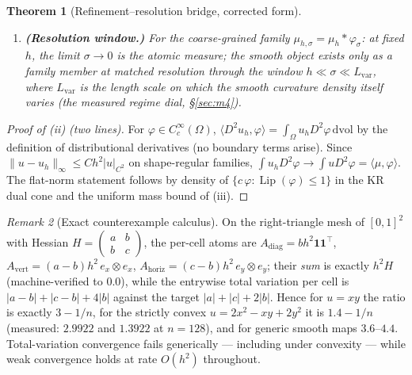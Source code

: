 \documentclass[11pt,a4paper]{article}
\theoremstyle{plain}
\newtheorem{theorem}{Theorem}[section]
\theoremstyle{definition}
\theoremstyle{remark}
\newtheorem{remark}[theorem]{Remark}
\newcommand{\Lip}{\operatorname{Lip}}
\newcommand{\dvol}{\,\mathrm{dvol}}
\begin{document}
\begin{theorem}[Refinement--resolution bridge, corrected form]
\begin{enumerate}[label=(\roman*),leftmargin=2em]
      naive three-facet patch is not the dual cell; the general statement
      requires the discrete-duality (dual-diamond) pairing.
\item \textbf{(Resolution window.)} For the coarse-grained family
      $\mu_{h,\sigma} = \mu_h * \varphi_\sigma$: at fixed $h$, the limit
      $\sigma \to 0$ is the \emph{atomic} measure; the smooth object
      exists only as a family member at matched resolution through the
      window $h \ll \sigma \ll L_{\mathrm{var}}$, where $L_{\mathrm{var}}$
      is the length scale on which the smooth curvature density itself
      varies (the measured regime dial,
      \S\ref{sec:m4}).
\end{enumerate}
\end{theorem}

\begin{proof}[Proof of (ii) (two lines)]
For $\varphi \in C_c^\infty(\Omega)$,
$\langle D^2 u_h, \varphi\rangle = \int_\Omega u_h D^2\varphi \dvol$ by the
definition of distributional derivatives (no boundary terms arise).
Since $\|u - u_h\|_\infty \le C h^2 |u|_{C^2}$ on shape-regular families,
$\int u_h D^2\varphi \to \int u D^2\varphi = \langle \mu, \varphi\rangle$.
The flat-norm statement follows by density of
$\{c\,\varphi : \Lip(\varphi)\le 1\}$ in the KR dual cone and the uniform
mass bound of (iii).
\end{proof}

\begin{remark}[Exact counterexample calculus]\label{rem:tvcounter}
On the right-triangle mesh of $[0,1]^2$ with Hessian
$H = \left(\begin{smallmatrix} a & b\\ b & c\end{smallmatrix}\right)$, the
per-cell atoms are $A_{\mathrm{diag}} = b h^2 \mathbf{1}\mathbf{1}^\top$,
$A_{\mathrm{vert}} = (a-b) h^2\, e_x \otimes e_x$,
$A_{\mathrm{horiz}} = (c-b) h^2\, e_y \otimes e_y$; their \emph{sum} is
exactly $h^2 H$ (machine-verified to $0.0$), while the entrywise total
variation per cell is $|a-b| + |c-b| + 4|b|$ against the target
$|a| + |c| + 2|b|$. Hence for $u = xy$ the ratio is exactly $3 - 1/n$, for
the strictly convex $u = 2x^2 - xy + 2y^2$ it is $1.4 - 1/n$ (measured:
$2.9922$ and $1.3922$ at $n=128$), and for generic smooth maps $3.6$--$4.4$.
Total-variation convergence fails generically --- including under
convexity --- while weak convergence holds at rate $O(h^2)$ throughout.
\end{remark}
\end{document}
